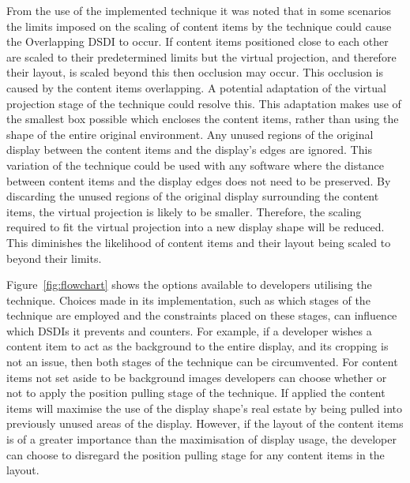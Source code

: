 \documentclass[review,5p,times,twocolumn]{elsarticle}
\begin{document}
From the use of the implemented technique it was noted that in some scenarios the limits imposed on the scaling of content items by the technique could cause the Overlapping \ac{DSDI} to occur.
If content items positioned close to each other are scaled to their predetermined limits but the virtual projection, and therefore their layout, is scaled beyond this then occlusion may occur.
This occlusion is caused by the content items overlapping.
A potential adaptation of the virtual projection stage of the technique could resolve this.  
This adaptation makes use of the smallest box possible which encloses the content items, rather than using the shape of the entire original environment.
Any unused regions of the original display between the content items and the display's edges are ignored.
This variation of the technique could be used with any software where the distance between content items and the display edges does not need to be preserved.
By discarding the unused regions of the original display surrounding the content items, the virtual projection is likely to be smaller.
Therefore, the scaling required to fit the virtual projection into a new display shape will be reduced.
This diminishes the likelihood of content items and their layout being scaled to beyond their limits. 

Figure~\ref{fig:flowchart} shows the options available to developers utilising the technique.
Choices made in its implementation, such as which stages of the technique are employed and the constraints placed on these stages, can influence which \acp{DSDI} it prevents and counters.
For example, if a developer wishes a content item to act as the background to the entire display, and its cropping is not an issue, then both stages of the technique can be circumvented.
For content items not set aside to be background images developers can choose whether or not to apply the position pulling stage of the technique.
If applied the content items will maximise the use of the display shape's real estate by being pulled into previously unused areas of the display.
However, if the layout of the content items is of a greater importance than the maximisation of display usage, the developer can choose to disregard the position pulling stage for any content items in the layout.
\end{document}
